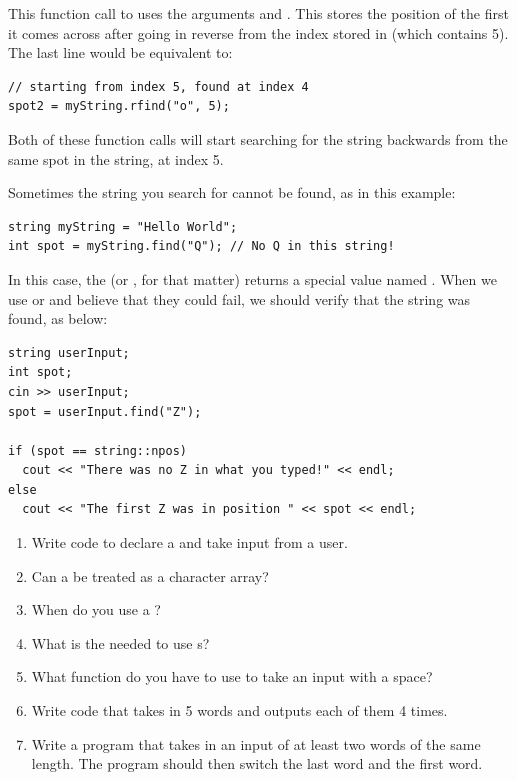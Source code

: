 \noindent This function call to  uses the arguments  and .
This stores the position of the first  it comes across after going in reverse from the index stored in  (which contains 5).
The last line would be equivalent to: \nopagebreak[4]

\noindent\begin{minipage}{\linewidth}\begin{lstlisting}
// starting from index 5, found at index 4
spot2 = myString.rfind("o", 5); 
\end{lstlisting}\end{minipage}

\noindent Both of these function calls will start searching for the string  backwards from the same spot in the string, at index 5. 

Sometimes the string you search for cannot be found, as in this example:

\noindent\begin{minipage}{\linewidth}\begin{lstlisting}
string myString = "Hello World";
int spot = myString.find("Q"); // No Q in this string!
\end{lstlisting}\end{minipage}

\noindent In this case, the  (or , for that matter) returns a special value named .
When we use  or  and believe that they could fail, we should verify that the string was found, as below:

\noindent\begin{minipage}{\linewidth}\begin{lstlisting}
string userInput;
int spot;
cin >> userInput;
spot = userInput.find("Z");

if (spot == string::npos)
  cout << "There was no Z in what you typed!" << endl;
else
  cout << "The first Z was in position " << spot << endl;
\end{lstlisting}\end{minipage}
\begin{enumerate}
\item Write code to declare a  and take input from a user.
\item Can a  be treated as a character array?
\item When do you use a ?
\item What is the  needed to use s?
\item What function do you have to use to take an input with a space?
\item Write code that takes in 5 words and outputs each of them 4 times.

\item Write a program that takes in an input of at least two words of the same length. 
			The program should then switch the last word and the first word.


\end{enumerate}

